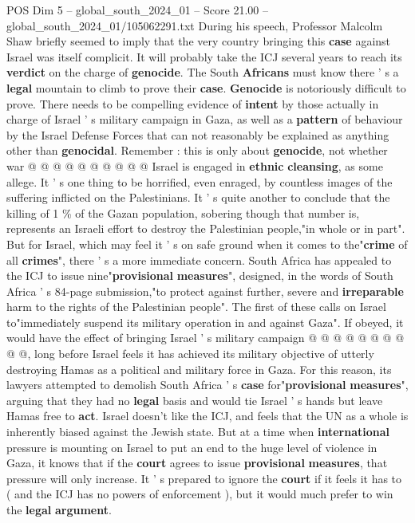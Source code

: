 \begin{textsample}{POS Dim 5 – global\_south\_2024\_01 – Score 21.00 – global\_south\_2024\_01/105062291.txt}
During his speech, Professor Malcolm Shaw briefly seemed to imply that the very country bringing this \textbf{case} against Israel was itself complicit.
It will probably take the ICJ several years to reach its \textbf{verdict} on the charge of \textbf{genocide}.
The South \textbf{Africans} must know there ' s a \textbf{legal} mountain to climb to prove their \textbf{case}. \textbf{Genocide} is notoriously difficult to prove.
There needs to be compelling evidence of \textbf{intent} by those actually in charge of Israel ' s military campaign in Gaza, as well as a \textbf{pattern} of behaviour by the Israel Defense Forces that can not reasonably be explained as anything other than \textbf{genocidal}.
Remember : this is only about \textbf{genocide}, not whether war @ @ @ @ @ @ @ @ @ @ Israel is engaged in \textbf{ethnic} \textbf{cleansing}, as some allege.
It ' s one thing to be horrified, even enraged, by countless images of the suffering inflicted on the Palestinians.
It ' s quite another to conclude that the killing of 1 \% of the Gazan population, sobering though that number is, represents an Israeli effort to destroy the Palestinian people,"in whole or in part".
But for Israel, which may feel it ' s on safe ground when it comes to the"\textbf{crime} of all \textbf{crimes}", there ' s a more immediate concern.
South Africa has appealed to the ICJ to issue nine"\textbf{provisional} \textbf{measures}", designed, in the words of South Africa ' s 84-page submission,"to protect against further, severe and \textbf{irreparable} harm to the rights of the Palestinian people".
The first of these calls on Israel to"immediately suspend its military operation in and against Gaza".
If obeyed, it would have the effect of bringing Israel ' s military campaign @ @ @ @ @ @ @ @ @ @, long before Israel feels it has achieved its military objective of utterly destroying Hamas as a political and military force in Gaza.
For this reason, its lawyers attempted to demolish South Africa ' s \textbf{case} for"\textbf{provisional} \textbf{measures}", arguing that they had no \textbf{legal} basis and would tie Israel ' s hands but leave Hamas free to \textbf{act}.
Israel doesn't like the ICJ, and feels that the UN as a whole is inherently biased against the Jewish state.
But at a time when \textbf{international} pressure is mounting on Israel to put an end to the huge level of violence in Gaza, it knows that if the \textbf{court} agrees to issue \textbf{provisional} \textbf{measures}, that pressure will only increase.
It ' s prepared to ignore the \textbf{court} if it feels it has to ( and the ICJ has no powers of enforcement ), but it would much prefer to win the \textbf{legal} \textbf{argument}.

\end{textsample}
